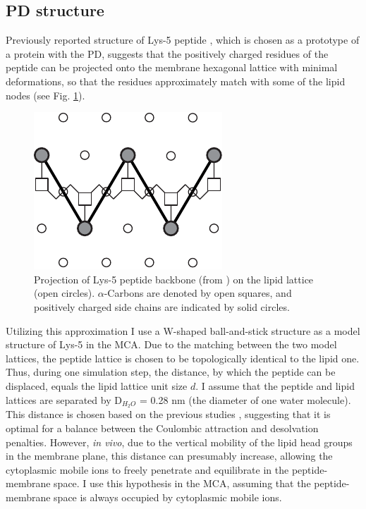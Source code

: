 \subsection{PD structure}

\label{polybasic_domain_structure}

Previously reported structure of Lys-5 peptide \cite{Ben-Tal1996}, which is chosen as a prototype of a protein with the PD, suggests that the positively charged residues of the peptide can be projected onto the membrane hexagonal lattice with minimal deformations, so that the residues approximately match with some of the lipid nodes (see Fig. \ref{fig:lys5_structure}).
\begin{figure}[!ht]
\begin{center}
  \includegraphics[scale=1.5]{../figures/lys5_structure.pdf}
\end{center}
 \caption[Projection of Lys-5 peptide backbone on the lipid lattice.]{Projection of Lys-5 peptide backbone (from \cite{Kiselev2011}) on the lipid lattice (open circles). $\alpha$-Carbons are denoted by open squares, and positively charged side chains are indicated by solid circles.}
\label{fig:lys5_structure}
\end{figure}
Utilizing this approximation I use a W-shaped ball-and-stick structure as a model structure of Lys-5 in the MCA. Due to the matching between the two model lattices, the peptide lattice is chosen to be topologically identical to the lipid one. Thus, during one simulation step, the distance, by which the peptide can be displaced, equals the lipid lattice unit size $d$. I assume that the peptide and lipid lattices are separated by D$_{H_2O}$ = 0.28 nm (the diameter of one water molecule). This distance is chosen based on the previous studies \cite{Murray1997,Murray1999}, suggesting that it is optimal for a balance between the Coulombic attraction and desolvation penalties. However, \emph{in vivo}, due to the vertical mobility of the lipid head groups in the membrane plane, this distance can presumably increase, allowing the cytoplasmic mobile ions to freely penetrate and equilibrate in the peptide-membrane space. I use this hypothesis in the MCA, assuming that the peptide-membrane space is always occupied by cytoplasmic mobile ions.

